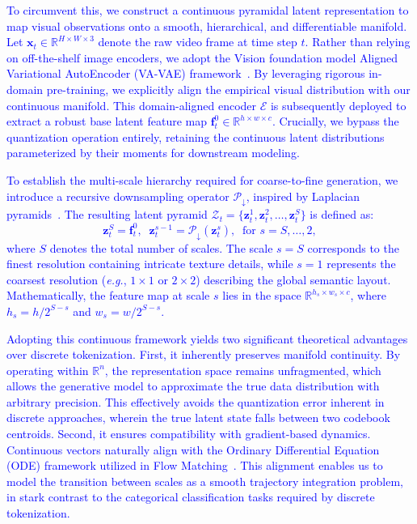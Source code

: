\textcolor{blue}{To circumvent this, we construct a continuous pyramidal latent representation to map visual observations onto a smooth, hierarchical, and differentiable manifold. 
Let $\boldsymbol{x}_t \in \mathbb{R}^{H \times W \times 3}$ denote the raw video frame at time step $t$. Rather than relying on off-the-shelf image encoders, we adopt the Vision foundation model Aligned Variational AutoEncoder (VA-VAE) framework~\cite{yao2025reconstruction}. By leveraging rigorous in-domain pre-training, we explicitly align the empirical visual distribution with our continuous manifold. This domain-aligned encoder $\mathcal{E}$ is subsequently deployed to extract a robust base latent feature map $\boldsymbol{f}_t^0 \in \mathbb{R}^{h \times w \times c}$. 
Crucially, we bypass the quantization operation entirely, retaining the continuous latent distributions parameterized by their moments for downstream modeling.}

\textcolor{blue}{To establish the multi-scale hierarchy required for coarse-to-fine generation, we introduce a recursive downsampling operator $\mathcal{P}_{\downarrow}$, inspired by Laplacian pyramids~\cite{denton2015deep}. The resulting latent pyramid $\mathcal{Z}_t = \{ \boldsymbol{z}_t^1, \boldsymbol{z}_t^2, \dots, \boldsymbol{z}_t^S \}$ is defined as:
\begin{equation}
    \boldsymbol{z}_t^S = \boldsymbol{f}_t^0, \;\; \boldsymbol{z}_t^{s-1} = \mathcal{P}_{\downarrow}(\boldsymbol{z}_t^s), \;\; \text{for } s = S, \dots, 2,
\end{equation}
where $S$ denotes the total number of scales. The scale $s=S$ corresponds to the finest resolution containing intricate texture details, while $s=1$ represents the coarsest resolution (\textit{e.g.}, $1 \times 1$ or $2 \times 2$) describing the global semantic layout. Mathematically, the feature map at scale $s$ lies in the space $\mathbb{R}^{h_s \times w_s \times c}$, where $h_s = h / 2^{S-s}$ and $w_s = w / 2^{S-s}$.}

\textcolor{blue}{Adopting this continuous framework yields two significant theoretical advantages over discrete tokenization. First, it inherently preserves manifold continuity. By operating within $\mathbb{R}^n$, the representation space remains unfragmented, which allows the generative model to approximate the true data distribution with arbitrary precision. This effectively avoids the quantization error inherent in discrete approaches, wherein the true latent state falls between two codebook centroids. Second, it ensures compatibility with gradient-based dynamics. Continuous vectors naturally align with the Ordinary Differential Equation (ODE) framework utilized in Flow Matching~\cite{chen2018neural, lipman2023flow}. This alignment enables us to model the transition between scales as a smooth trajectory integration problem, in stark contrast to the categorical classification tasks required by discrete tokenization.}

